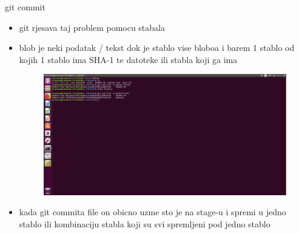 \documentclass[]{beamer}
\begin{document}
\begin{frame}{git commit}

\begin{itemize}
	\item git rjesava taj problem pomocu stabala
	\item blob je neki podatak / tekst dok je stablo vise bloboa i barem 1 stablo od kojih 1 stablo ima SHA-1 te datoteke ili stabla koji ga ima
	\begin{figure}
		\centering
	\includegraphics[scale=.48]{./slike/treca_slika.jpg}
	\end{figure}
	\item kada git commita file on obicno uzme sto je na stage-u i spremi u jedno stablo ili kombinaciju stabla koji su svi spremljeni pod jedno stablo
\end{itemize}
\end{frame}
\end{document}
